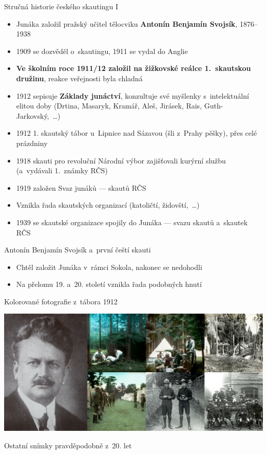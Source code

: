 \documentclass[compress, ucs, xelatex, xcolor=dvipsnames, print,
  hyperref={
    bookmarks=true,
    unicode=true,
    colorlinks=true,
    plainpages=false,
    pdfkeywords={Skaut, Junak, Skauting, Vychovna metoda},
    linkcolor=Black,
    anchorcolor=Black,
    citecolor=OliveGreen,
    filecolor=OliveGreen,
    menucolor=Black,
    urlcolor=OliveGreen,
    pdftex}
  ]{beamer}
\begin{document}
\begin{frame}{Stručná historie českého skautingu I}
  \begin{itemize}
    \item Junáka založil pražský učitel tělocviku \textbf{Antonín Benjamín Svojsík}, 1876--1938
    \item 1909 se dozvěděl o~skautingu, 1911 se vydal do Anglie
    \item \textbf{Ve školním roce 1911/12 založil na žižkovské reálce 1.~skautskou družinu}, reakce veřejnosti byla chladná
    \item 1912 sepisuje \textbf{Základy junáctví}, konzultuje své myšlenky s~intelektuální elitou doby (Drtina, Masaryk, Kramář, Aleš, Jirásek, Rais, Guth-Jarkovský,~\ldots)
    \item 1912 1. skautský tábor u~Lipnice nad Sázavou (šli z~Prahy pěšky), přes celé prázdniny
    \item 1918 skauti pro revoluční Národní výbor zajišťovali kurýrní službu (a~vydávali 1.~známky RČS)
    \item 1919 založen Svaz junáků --- skautů RČS
    \item Vznikla řada skautských organizací (katoličtí, židovští,~\ldots)
    \item 1939 se skautské organizace spojily do Junáka --- svazu skautů a~skautek RČS
  \end{itemize}
\end{frame}

\begin{frame}{Antonín Benjamín Svojsík a~první čeští skauti}
  \begin{itemize}
    \item Chtěl založit Junáka v~rámci Sokola, nakonec se nedohodli
    \item Na přelomu 19. a~20. století vznikla řada podobných hnutí
  \end{itemize}
  \begin{flushright}
    Kolorované fotografie z~tábora 1912
  \end{flushright}
  \includegraphics[width=\textwidth]{svojsik_prvni_skauti.jpg}
  \begin{flushright}
    Ostatní snímky pravděpodobně z~20. let
  \end{flushright}
\end{frame}
\end{document}
